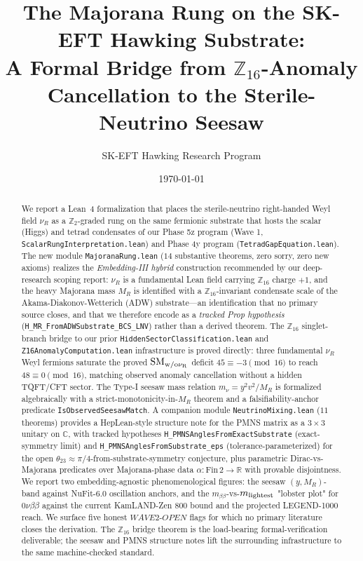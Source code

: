 \documentclass[aps,prd,twocolumn,showpacs,superscriptaddress,nofootinbib]{revtex4-2}
\newcommand{\SterileNu}{\nu_R}
\newcommand{\HeavyMaj}{M_R}
\newcommand{\LightNu}{m_\nu}
\newcommand{\mbb}{m_{\beta\beta}}
\begin{document}
\title{The Majorana Rung on the SK-EFT Hawking Substrate:\\
A Formal Bridge from $\mathbb{Z}_{16}$-Anomaly Cancellation to the
Sterile-Neutrino Seesaw}

\author{SK-EFT Hawking Research Program}

\date{\today}

\begin{abstract}
We report a Lean~4 formalization that places the sterile-neutrino
right-handed Weyl field $\SterileNu$ as a $\mathbb{Z}_2$-graded rung on
the same fermionic substrate that hosts the scalar (Higgs) and tetrad
condensates of our Phase 5z program (Wave 1, \texttt{ScalarRungInterpretation.lean})
and Phase 4y program (\texttt{TetradGapEquation.lean}). The new module
\texttt{MajoranaRung.lean} ($14$ substantive theorems, zero sorry, zero
new axioms) realizes the \emph{Embedding-III hybrid} construction
recommended by our deep-research scoping report: $\SterileNu$ is a
fundamental Lean field carrying $\mathbb{Z}_{16}$ charge $+1$, and the
heavy Majorana mass $\HeavyMaj$ is identified with a
$\mathbb{Z}_{16}$-invariant condensate scale of the Akama-Diakonov-Wetterich
(ADW) substrate---an identification that no primary source closes, and
that we therefore encode as a \emph{tracked Prop hypothesis}
(\texttt{H\_MR\_FromADWSubstrate\_BCS\_LNV}) rather than a derived theorem. The
$\mathbb{Z}_{16}$ singlet-branch bridge to our prior
\texttt{HiddenSectorClassification.lean} and \texttt{Z16AnomalyComputation.lean}
infrastructure is proved directly: three fundamental
$\SterileNu$ Weyl fermions saturate the proved
$\mathrm{SM}_{\rm w/o\nu_R}$ deficit
$45 \equiv -3 \pmod{16}$ to reach $48 \equiv 0 \pmod{16}$,
matching observed anomaly cancellation without a hidden TQFT/CFT
sector. The Type-I seesaw mass relation $\LightNu = y^2 v^2 / \HeavyMaj$
is formalized algebraically with a strict-monotonicity-in-$\HeavyMaj$
theorem and a falsifiability-anchor predicate
\texttt{IsObservedSeesawMatch}. A companion module
\texttt{NeutrinoMixing.lean} ($11$ theorems) provides a
HepLean-style structure note for the PMNS matrix as a
$3\!\times\!3$ unitary on $\mathbb{C}$, with tracked hypotheses
\texttt{H\_PMNSAnglesFromExactSubstrate} (exact-symmetry limit) and
\texttt{H\_PMNSAnglesFromSubstrate\_eps} (tolerance-parameterized) for the open
$\theta_{23} \approx \pi/4$-from-substrate-symmetry conjecture, plus
parametric Dirac-vs-Majorana predicates over Majorana-phase data
$\alpha : \mathrm{Fin}\, 2 \to \mathbb{R}$ with provable disjointness. We
report two embedding-agnostic phenomenological figures: the seesaw
$(y, \HeavyMaj)$-band against NuFit-6.0 oscillation anchors, and the
$\mbb$-vs-$m_{\rm lightest}$ "lobster plot" for $0\nu\beta\beta$
against the current KamLAND-Zen 800 bound and the projected LEGEND-1000
reach. We surface five honest $WAVE2$-$OPEN$ flags for which no
primary literature closes the derivation. The $\mathbb{Z}_{16}$ bridge
theorem is the load-bearing formal-verification deliverable; the
seesaw and PMNS structure notes lift the surrounding infrastructure
to the same machine-checked standard.
\end{abstract}
\end{document}
